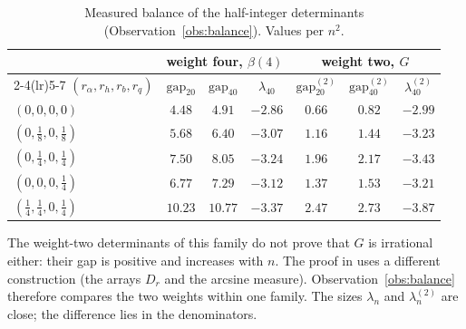 \documentclass[11pt]{article}
\theoremstyle{definition}
\begin{document}
\begin{table}[ht]
\centering
\small
\caption{Measured balance of the half-integer determinants (Observation~\ref{obs:balance}). Values per $n^2$.}\label{tab:balance}
\begin{tabular}{lcccccc}
\toprule
& \multicolumn{3}{c}{weight four, $\beta(4)$} & \multicolumn{3}{c}{weight two, $G$}\\
\cmidrule(lr){2-4}\cmidrule(lr){5-7}
$(r_\alpha,r_h,r_b,r_q)$ & $\text{gap}_{20}$ & $\text{gap}_{40}$ & $\lambda_{40}$ & $\text{gap}^{(2)}_{20}$ & $\text{gap}^{(2)}_{40}$ & $\lambda^{(2)}_{40}$\\
\midrule
$(0,0,0,0)$ & $4.48$ & $4.91$ & $-2.86$ & $0.66$ & $0.82$ & $-2.99$\\
$(0,\frac18,0,\frac18)$ & $5.68$ & $6.40$ & $-3.07$ & $1.16$ & $1.44$ & $-3.23$\\
$(0,\frac14,0,\frac14)$ & $7.50$ & $8.05$ & $-3.24$ & $1.96$ & $2.17$ & $-3.43$\\
$(0,0,0,\frac14)$ & $6.77$ & $7.29$ & $-3.12$ & $1.37$ & $1.53$ & $-3.21$\\
$(\frac14,\frac14,0,\frac14)$ & $10.23$ & $10.77$ & $-3.37$ & $2.47$ & $2.73$ & $-3.87$\\
\bottomrule
\end{tabular}
\end{table}

The weight-two determinants of this family do not prove that $G$ is irrational either: their gap is positive and increases with $n$. The proof in \cite{OAI} uses a different construction (the arrays $D_r$ and the arcsine measure). Observation~\ref{obs:balance} therefore compares the two weights within one family. The sizes $\lambda_n$ and $\lambda^{(2)}_n$ are close; the difference lies in the denominators.
\end{document}
